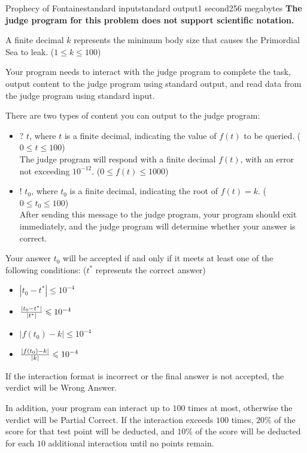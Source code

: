 \begin{problem}{Prophecy of Fontaine}{standard input}{standard output}{1 second}{256 megabytes}
\InputFile
\textbf{The judge program for this problem does not support scientific notation.}

A finite decimal $k$ represents the minimum body size that causes the Primordial Sea to leak. ($1 \le k \le 100$)

\Interaction
Your program needs to interact with the judge program to complete the task, output content to the judge program using standard output, and read data from the judge program using standard input.

There are two types of content you can output to the judge program:

\begin{itemize}
\item ? $t$, where $t$ is a finite decimal, indicating the value of $f(t)$ to be queried. ($0 \le t \le 100$) \\
The judge program will respond with a finite decimal $f(t)$, with an error not exceeding $10^{-12}$. ($0 \le f(t) \le 1000$)
\item ! $t_0$, where $t_0$ is a finite decimal, indicating the root of $f(t) = k$. ($0 \le t_0 \le 100$) \\
After sending this message to the judge program, your program should exit immediately, and the judge program will determine whether your answer is correct.
\end{itemize}

Your answer $t_0$ will be accepted if and only if it meets at least one of the following conditions: ($t^*$ represents the correct answer)
\begin{itemize}
\item $|t_0 - t^*| \le 10^{-4}$
\item ${|t_0 - t^*| \over |t^*|} \le 10^{-4}$
\item $|f(t_0) - k| \le 10^{-4}$
\item ${|f(t_0) - k| \over |k|} \le 10^{-4}$
\end{itemize}

If the interaction format is incorrect or the final answer is not accepted, the verdict will be Wrong Answer.

In addition, your program can interact up to $100$ times at most, otherwise the verdict will be Partial Correct. If the interaction exceeds $100$ times, $20\%$ of the score for that test point will be deducted, and $10\%$ of the score will be deducted for each $10$ additional interaction until no points remain.

\Example

\begin{example}
%
\end{example}

\end{problem}

